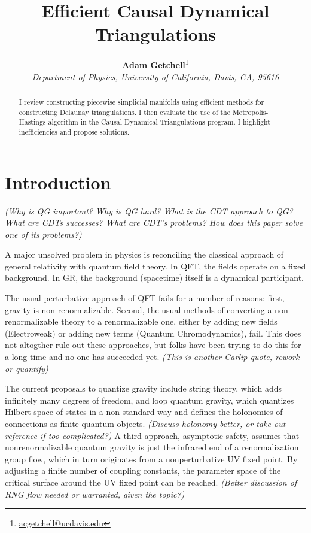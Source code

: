 \documentclass[12pt]{article}
\title{Efficient Causal Dynamical Triangulations}
\author{\textbf{Adam Getchell}\footnote{\href{mailto:acgetchell@ucdavis.edu}{acgetchell@ucdavis.edu}}\\\textit{Department of Physics,
University of California, Davis, CA, 95616}}
\begin{document}
\maketitle

\begin{abstract}
I review constructing piecewise simplicial manifolds using efficient
methods for constructing Delaunay triangulations. I then evaluate the use of
the Metropolis-Hastings algorithm in the Causal Dynamical Triangulations
program. I highlight inefficiencies and propose solutions.
\end{abstract}

\section{Introduction}

\textit{(Why is QG important? Why is QG hard? What is the CDT approach to QG? What are CDTs successes? What are CDT's problems? How does this paper solve one of its problems?)}

A major unsolved problem in physics is reconciling the classical approach of general relativity with quantum field theory. In QFT, the fields operate on a fixed background. In GR, the background (spacetime) itself is a dynamical participant.

The usual perturbative approach of QFT fails for a number of reasons: first, gravity is non-renormalizable. Second, the usual methods of converting a non-renormalizable theory to a renormalizable one, either by adding new fields (Electroweak) or adding new terms (Quantum Chromodynamics), fail. This does not altogther rule out these approaches, but folks have been trying to do this for a long time and no one has succeeded yet. \textit{(This is another Carlip quote, rework or quantify)}

The current proposals to quantize gravity include string theory, which adds infinitely many degrees of freedom, and loop quantum gravity, which quantizes Hilbert space of states in a non-standard way and defines the holonomies of connections as finite quantum objects. \textit{(Discuss holonomy better, or take out reference if too complicated?)} A third approach, asymptotic safety, assumes that nonrenormalizable quantum gravity is just the infrared end of a renormalization group flow, which in turn originates from a nonperturbative UV fixed point. By adjusting a finite number of coupling constants, the parameter space of the critical surface around the UV fixed point can be reached. \textit{(Better discussion of RNG flow needed or warranted, given the topic?)}
\end{document}

